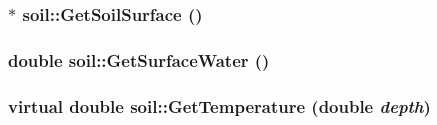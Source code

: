 \label{classsoil_a07a04782ac233c63f2f2246f89fb15c6}
\hypertarget{classsoil_af438d2978a46a31b4ea15e13d23fd98d}{
\subsubsection[{GetSoilSurface}]{$\ast$ soil::GetSoilSurface ()}}
\label{classsoil_af438d2978a46a31b4ea15e13d23fd98d}
\hypertarget{classsoil_a5b84e06a756061c8bb3c71ddb800929a}{
\subsubsection[{GetSurfaceWater}]{\setlength{\rightskip}{0pt plus 5cm}double soil::GetSurfaceWater ()}}
\label{classsoil_a5b84e06a756061c8bb3c71ddb800929a}
\hypertarget{classsoil_a30a2ef147290c60895e4c389ad3c72b8}{
\subsubsection[{GetTemperature}]{\setlength{\rightskip}{0pt plus 5cm}virtual double soil::GetTemperature (double {\em depth})}}
\label{classsoil_a30a2ef147290c60895e4c389ad3c72b8}


